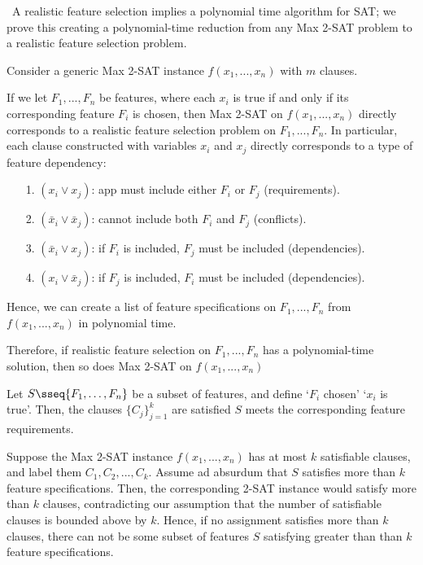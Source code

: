 \documentclass{article}
\begin{document}
\begin{solution}\
A realistic feature selection implies a polynomial time algorithm for SAT; we prove this creating a polynomial-time reduction from any Max 2-SAT problem to a realistic feature selection problem.

Consider a generic Max 2-SAT instance \( f(x_1, ..., x_n) \) with \( m \) clauses.

If we let \( F_1, ..., F_n \) be features, where each \( x_i \) is true if and only if its corresponding feature \( F_i \) is chosen, then Max 2-SAT on \( f(x_1, ..., x_n) \) directly corresponds to a realistic feature selection problem on \( F_1, ..., F_n \). In particular, each clause constructed with variables \( x_i \) and \( x_j \) directly corresponds to a type of feature dependency:
\begin{enumerate}
    \item [1.] \( (x_i \lor x_j) \): app must include either \( F_i \) or \( F_j \) (requirements).
    \item [2.] \( (\bar{x}_i \lor \bar{x}_j) \): cannot include both \( F_i \) and \( F_j \) (conflicts).
    \item [3.] \( (\bar{x}_i \lor x_j) \): if \( F_i \) is included, \( F_j \) must be included (dependencies).
    \item [4.] \( (x_i \lor \bar{x}_j) \): if \( F_j \) is included, \( F_i \) must be included (dependencies).
\end{enumerate}

Hence, we can create a list of feature specifications on \( F_1, ..., F_n \) from \( f(x_1, ..., x_n) \) in polynomial time.

Therefore, if realistic feature selection on \( F_1, ..., F_n \) has a polynomial-time solution, then so does Max 2-SAT on \( f(x_1, ..., x_n) \)


\begin{subproof}[Correctness.]
Let \( S\sseq\{F_1,\ldots,F_n\} \) be a subset of features, and define `\( F_i \) chosen' \iff `\( x_i \) is true'. Then, the clauses \( \{C_j\}_{j=1}^k \) are satisfied \iff \( S \) meets the corresponding feature requirements.

Suppose the Max 2-SAT instance \( f(x_1, ..., x_n) \) has at most \( k \) satisfiable clauses, and label them \( C_1, C_2, ..., C_k \).
Assume ad absurdum that \( S \) satisfies more than \( k \) feature specifications. Then, the corresponding 2-SAT instance would satisfy more than \( k \) clauses, contradicting our assumption that the number of satisfiable clauses is bounded above by \( k \). Hence, if no assignment satisfies more than \( k \) clauses, there can not be some subset of features \( S \) satisfying greater than than \( k \) feature specifications.


\end{subproof}
\end{solution}
\end{document}
